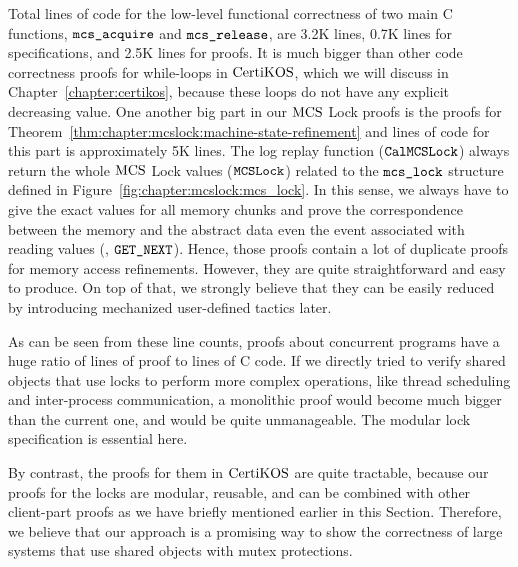 Total lines of code for the low-level functional correctness
of two main C functions, ${\mathrm{\texttt{mcs\_acquire}}}$ and ${\mathrm{\texttt{mcs\_release}}}$, are 3.2K lines,  
0.7K lines for specifications, and 2.5K lines for proofs.
It is much bigger than other code correctness proofs for while-loops in $\mathrm{CertiKOS}$, which we will
discuss in Chapter~\ref{chapter:certikos},
because these loops do not have any explicit decreasing value.
One another big part in our $\mathrm{MCS}$ Lock proofs is the proofs for 
Theorem~\ref{thm:chapter:mcslock:machine-state-refinement} and  lines of code for this part is 
approximately 5K lines. The log replay function (${\mathrm{\texttt{CalMCSLock}}}$) always 
return the whole $\mathrm{MCS}$ Lock values (${\mathrm{\texttt{MCSLock}}}$) related 
to the  ${\mathrm{\texttt{mcs\_lock}}}$ structure defined in Figure~\ref{fig:chapter:mcslock:mcs_lock}. 
In this sense, we always have to give the exact values for all memory 
chunks and prove the correspondence between the memory and the abstract 
data even the event associated with reading values (\eg, ${\mathrm{\texttt{GET\_NEXT}}}$).
Hence, those proofs contain a lot of duplicate proofs for memory access refinements. 
However, they are quite straightforward and easy to produce. 
On top of that, we strongly believe that they can be easily reduced by introducing mechanized user-defined tactics later. 


As can be seen from these line counts, proofs about concurrent programs
have a huge ratio of lines of proof to lines of C code.
If we directly tried to  verify shared objects that use locks to 
perform more complex operations, like thread scheduling
and inter-process communication, a monolithic proof  
would become much bigger than the current one, and would be quite
unmanageable. The modular lock specification is essential here.

By contrast, the proofs for them in $\mathrm{CertiKOS}$ are quite tractable, 
because our proofs for the locks are modular, reusable, and can 
be combined with other client-part proofs as we have briefly 
mentioned earlier in this Section.
Therefore, we believe that our approach is a promising way to show the correctness of large systems that use shared objects with mutex protections. 